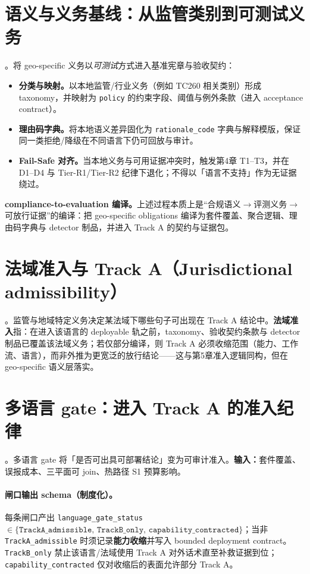 \documentclass[11pt,a4paper]{report}
\begin{document}
\section{语义与义务基线：从监管类别到可测试义务}
\EvalFramework{}。将 geo-specific 义务以\emph{可测试}方式进入基准宪章与验收契约：
\begin{itemize}
  \item \textbf{分类与映射。}以本地监管/行业义务（例如 TC260 相关类别）形成 taxonomy，并映射为 \texttt{policy} 的约束字段、阈值与例外条款（进入 acceptance contract）。
  \item \textbf{理由码字典。}将本地语义差异固化为 \texttt{rationale\_code} 字典与解释模版，保证同一类拒绝/降级在不同语言下仍可回放与审计。
  \item \textbf{Fail-Safe 对齐。}当本地义务与可用证据冲突时，触发第4章 T1--T3，并在 D1--D4 与 Tier-R1/Tier-R2 纪律下退化；不得以「语言不支持」作为无证据绕过。
\end{itemize}

\noindent\textbf{compliance-to-evaluation 编译。}上述过程本质上是“合规语义$\rightarrow$评测义务$\rightarrow$可放行证据”的编译：把 geo-specific obligations 编译为套件覆盖、聚合逻辑、理由码字典与 detector 制品，并进入 Track A 的契约与证据包。

\section{法域准入与 Track A（Jurisdictional admissibility）}
\EvalFramework{}。监管与地域特定义务决定某法域下哪些句子可出现在 Track A 结论中。\textbf{法域准入}指：在进入该语言的 deployable 轨之前，taxonomy、验收契约条款与 detector 制品已覆盖该法域义务；若仅部分编译，则 Track A 必须收缩范围（能力、工作流、语言），而非外推为更宽泛的放行结论——这与第5章准入逻辑同构，但在 geo-specific 语义层落实。

\section{多语言 gate：进入 Track A 的准入纪律}
\EvalFramework{}。多语言 gate 将「是否可出具可部署结论」变为可审计准入。\textbf{输入：}套件覆盖、误报成本、三平面可 join、热路径 S1 预算影响。

\paragraph{闸口输出 schema（制度化）。}每条闸口产出 \texttt{language\_gate\_status} \(\in \{\texttt{TrackA\_admissible},\,\texttt{TrackB\_only},\,\texttt{capability\_contracted}\}\)；当非 \texttt{TrackA\_admissible} 时须记录\textbf{能力收缩}并写入 bounded deployment contract。\texttt{TrackB\_only} 禁止该语言/法域使用 Track A 对外话术直至补救证据到位；\texttt{capability\_contracted} 仅对收缩后的表面允许部分 Track A。
\end{document}

